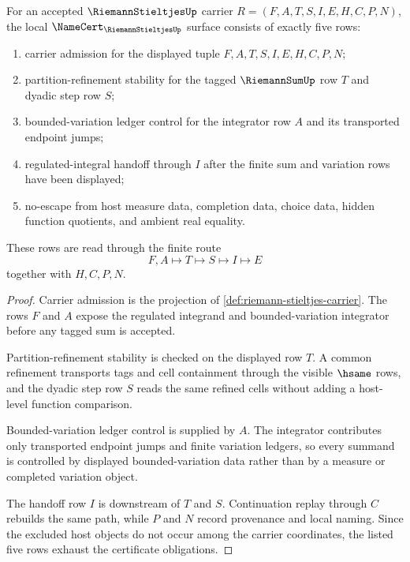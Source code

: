 \begin{theorem}
\label{thm:riemann-stieltjes-namecert-obligations}
For an accepted $\RiemannStieltjesUp$ carrier $R=(F,A,T,S,I,E,H,C,P,N)$, the local $\NameCert_{\RiemannStieltjesUp}$ surface consists of exactly five rows:
\begin{enumerate}
\item carrier admission for the displayed tuple $F,A,T,S,I,E,H,C,P,N$;
\item partition-refinement stability for the tagged $\RiemannSumUp$ row $T$ and dyadic step row $S$;
\item bounded-variation ledger control for the integrator row $A$ and its transported endpoint jumps;
\item regulated-integral handoff through $I$ after the finite sum and variation rows have been displayed;
\item no-escape from host measure data, completion data, choice data, hidden function quotients, and ambient real equality.
\end{enumerate}
These rows are read through the finite route
$$
F,A\longmapsto T\longmapsto S\longmapsto I\longmapsto E
$$
together with $H,C,P,N$.
\end{theorem}
\begin{proof}
Carrier admission is the projection of \autoref{def:riemann-stieltjes-carrier}. The rows $F$ and $A$ expose the regulated integrand and bounded-variation integrator before any tagged sum is accepted.

Partition-refinement stability is checked on the displayed row $T$. A common refinement transports tags and cell containment through the visible $\hsame$ rows, and the dyadic step row $S$ reads the same refined cells without adding a host-level function comparison.

Bounded-variation ledger control is supplied by $A$. The integrator contributes only transported endpoint jumps and finite variation ledgers, so every summand is controlled by displayed bounded-variation data rather than by a measure or completed variation object.

The handoff row $I$ is downstream of $T$ and $S$. Continuation replay through $C$ rebuilds the same path, while $P$ and $N$ record provenance and local naming. Since the excluded host objects do not occur among the carrier coordinates, the listed five rows exhaust the certificate obligations.
\end{proof}

